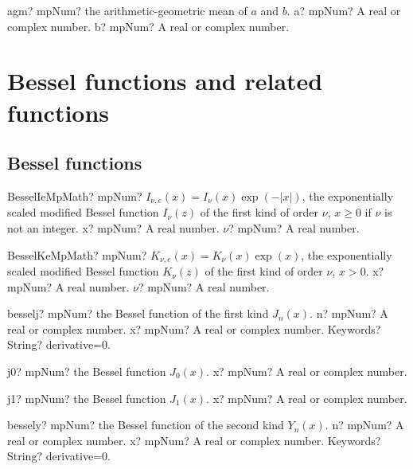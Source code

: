 \documentclass[12pt,a4paper,openany]{book}
\begin{document}
\begin{mpFunctionsExtract}
\mpFunctionTwo
{agm? mpNum? the arithmetic-geometric mean of $a$ and $b$.}
{a? mpNum? A real or complex number.}
{b? mpNum? A real or complex number.}
\end{mpFunctionsExtract}

\chapter{Bessel functions and related functions}

\section{Bessel functions}

\begin{mpFunctionsExtract}
\mpFunctionTwoNotImplemented
{BesselIeMpMath? mpNum? $I_{\nu, e}(x) = I_{\nu}(x) \exp(-|x|)$, the exponentially scaled modified Bessel function $I_{\nu}(z)$ of the first kind of order $\nu$, $x \geq 0$ if $\nu$ is not an integer.}
{x? mpNum? A real number.}
{$\nu$? mpNum? A real number.}
\end{mpFunctionsExtract}

\begin{mpFunctionsExtract}
\mpFunctionTwoNotImplemented
{BesselKeMpMath? mpNum? $K_{\nu, e}(x) = K_{\nu}(x) \exp(x)$, the exponentially scaled modified Bessel function $K_{\nu}(z)$ of the first kind of order $\nu$, $x > 0$.}
{x? mpNum? A real number.}
{$\nu$? mpNum? A real number.}
\end{mpFunctionsExtract}

\begin{mpFunctionsExtract}
\mpFunctionThree
{besselj? mpNum? the Bessel function of the first kind $J_n(x)$.}
{n? mpNum? A real or complex number.}
{x? mpNum? A real or complex number.}
{Keywords? String? derivative=0.}
\end{mpFunctionsExtract}

\begin{mpFunctionsExtract}
\mpFunctionOne
{j0? mpNum? the Bessel function $J_0(x)$.}
{x? mpNum? A real or complex number.}
\end{mpFunctionsExtract}

\begin{mpFunctionsExtract}
\mpFunctionOne
{j1? mpNum? the Bessel function $J_1(x)$.}
{x? mpNum? A real or complex number.}
\end{mpFunctionsExtract}

\begin{mpFunctionsExtract}
\mpFunctionThree
{bessely? mpNum? the Bessel function of the second kind $Y_n(x)$.}
{n? mpNum? A real or complex number.}
{x? mpNum? A real or complex number.}
{Keywords? String? derivative=0.}
\end{mpFunctionsExtract}
\end{document}
